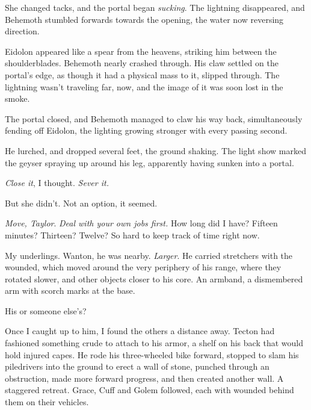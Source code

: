 She changed tacks, and the portal began \emph{sucking}.  The lightning disappeared, and Behemoth stumbled forwards towards the opening, the water now reversing direction.



Eidolon appeared like a spear from the heavens, striking him between the shoulderblades.  Behemoth nearly crashed through.  His claw settled on the portal's edge, as though it had a physical mass to it, slipped through.  The lightning wasn't traveling far, now, and the image of it was soon lost in the smoke.



The portal closed, and Behemoth managed to claw his way back, simultaneously fending off Eidolon, the lighting growing stronger with every passing second.



He lurched, and dropped several feet, the ground shaking.  The light show marked the geyser spraying up around his leg, apparently having sunken into a portal.



\emph{Close it}, I thought.  \emph{Sever it.}



But she didn't.  Not an option, it seemed.



\emph{Move, Taylor}.  \emph{Deal with your own jobs first.}  How long did I have?  Fifteen minutes?  Thirteen?  Twelve?  So hard to keep track of time right now.



My underlings.  Wanton, he was nearby.  \emph{Larger}.  He carried stretchers with the wounded, which moved around the very periphery of his range, where they rotated slower, and other objects closer to his core.  An armband, a dismembered arm with scorch marks at the base.



His or someone else's?



Once I caught up to him, I found the others a distance away.  Tecton had fashioned something crude to attach to his armor, a shelf on his back that would hold injured capes.  He rode his three-wheeled bike forward, stopped to slam his piledrivers into the ground to erect a wall of stone, punched through an obstruction, made more forward progress, and then created another wall.  A staggered retreat.  Grace, Cuff and Golem followed, each with wounded behind them on their vehicles.



